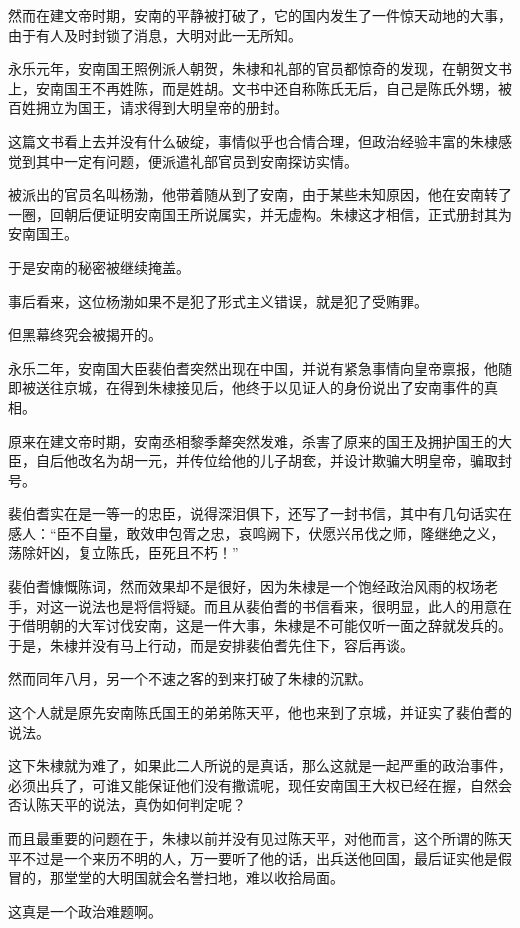 \begin{multicols}{\theparacolNo}
然而在建文帝时期，安南的平静被打破了，它的国内发生了一件惊天动地的大事，由于有人及时封锁了消息，大明对此一无所知。

永乐元年，安南国王照例派人朝贺，朱棣和礼部的官员都惊奇的发现，在朝贺文书上，安南国王不再姓陈，而是姓胡。文书中还自称陈氏无后，自己是陈氏外甥，被百姓拥立为国王，请求得到大明皇帝的册封。

这篇文书看上去并没有什么破绽，事情似乎也合情合理，但政治经验丰富的朱棣感觉到其中一定有问题，便派遣礼部官员到安南探访实情。

被派出的官员名叫杨渤，他带着随从到了安南，由于某些未知原因，他在安南转了一圈，回朝后便证明安南国王所说属实，并无虚构。朱棣这才相信，正式册封其为安南国王。

于是安南的秘密被继续掩盖。

事后看来，这位杨渤如果不是犯了形式主义错误，就是犯了受贿罪。

但黑幕终究会被揭开的。

永乐二年，安南国大臣裴伯耆突然出现在中国，并说有紧急事情向皇帝禀报，他随即被送往京城，在得到朱棣接见后，他终于以见证人的身份说出了安南事件的真相。

原来在建文帝时期，安南丞相黎季犛突然发难，杀害了原来的国王及拥护国王的大臣，自后他改名为胡一元，并传位给他的儿子胡奃，并设计欺骗大明皇帝，骗取封号。

裴伯耆实在是一等一的忠臣，说得深泪俱下，还写了一封书信，其中有几句话实在感人：“臣不自量，敢效申包胥之忠，哀鸣阙下，伏愿兴吊伐之师，隆继绝之义，荡除奸凶，复立陈氏，臣死且不朽！”

裴伯耆慷慨陈词，然而效果却不是很好，因为朱棣是一个饱经政治风雨的权场老手，对这一说法也是将信将疑。而且从裴伯耆的书信看来，很明显，此人的用意在于借明朝的大军讨伐安南，这是一件大事，朱棣是不可能仅听一面之辞就发兵的。于是，朱棣并没有马上行动，而是安排裴伯耆先住下，容后再谈。

然而同年八月，另一个不速之客的到来打破了朱棣的沉默。

这个人就是原先安南陈氏国王的弟弟陈天平，他也来到了京城，并证实了裴伯耆的说法。

这下朱棣就为难了，如果此二人所说的是真话，那么这就是一起严重的政治事件，必须出兵了，可谁又能保证他们没有撒谎呢，现任安南国王大权已经在握，自然会否认陈天平的说法，真伪如何判定呢？

而且最重要的问题在于，朱棣以前并没有见过陈天平，对他而言，这个所谓的陈天平不过是一个来历不明的人，万一要听了他的话，出兵送他回国，最后证实他是假冒的，那堂堂的大明国就会名誉扫地，难以收拾局面。

这真是一个政治难题啊。


\end{multicols}
